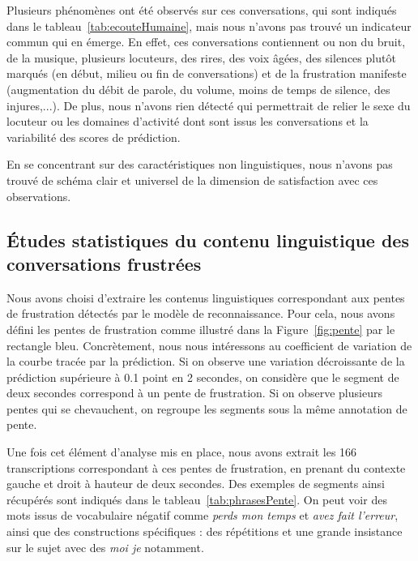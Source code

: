 Plusieurs phénomènes ont été observés sur ces conversations, qui sont indiqués dans le tableau~\ref{tab:ecouteHumaine}, mais nous n'avons pas trouvé un indicateur commun qui en émerge. En effet, ces conversations contiennent ou non du bruit, de la musique, plusieurs locuteurs, des rires, des voix âgées, des silences plutôt marqués (en début, milieu ou fin de conversations) et de la frustration manifeste (augmentation du débit de parole, du volume, moins de temps de silence, des injures,...). De plus, nous n'avons rien détecté qui permettrait de relier le sexe du locuteur ou les domaines d'activité dont sont issus les conversations et la variabilité des scores de prédiction.

En se concentrant sur des caractéristiques non linguistiques, nous n'avons pas trouvé de schéma clair et universel de la dimension de satisfaction avec ces observations.

\subsection{Études statistiques du contenu linguistique des conversations frustrées}

Nous avons choisi d'extraire les contenus linguistiques correspondant aux pentes de frustration détectés par le modèle de reconnaissance. Pour cela, nous avons défini les pentes de frustration comme illustré dans la Figure~\ref{fig:pente} par le rectangle bleu. Concrètement, nous nous intéressons au coefficient de variation de la courbe tracée par la prédiction. Si on observe une variation décroissante de la prédiction supérieure à 0.1 point en 2 secondes, on considère que le segment de deux secondes correspond à un pente de frustration. Si on observe plusieurs pentes qui se chevauchent, on regroupe les segments sous la même annotation de pente.



Une fois cet élément d'analyse mis en place, nous avons extrait les 166 transcriptions correspondant à ces pentes de frustration, en prenant du contexte gauche et droit à hauteur de deux secondes. Des exemples de segments ainsi récupérés sont indiqués dans le tableau~\ref{tab:phrasesPente}. On peut voir des mots issus de vocabulaire négatif comme \textit{perds mon temps} et \textit{avez fait l'erreur}, ainsi que des constructions spécifiques : des répétitions et une grande insistance sur le sujet avec des \textit{moi je} notamment.


